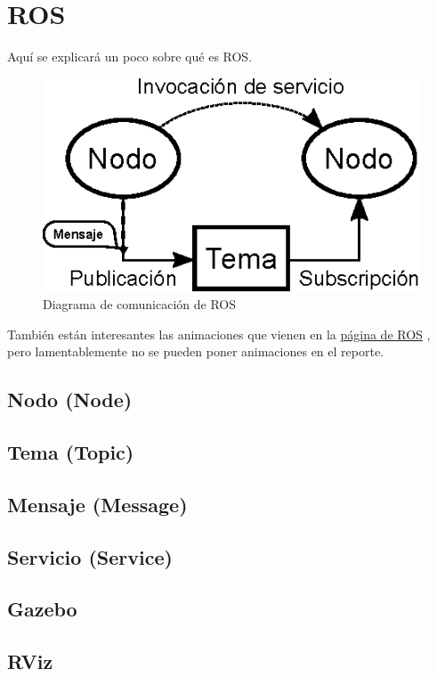 \section{ROS} \label{sec:ros}
Aquí se explicará un poco sobre qué es ROS.
\begin{figure}[h]
	\centering
	\includegraphics[width=0.5\linewidth]{img/ROS_concepts}
	\caption{Diagrama de comunicación de ROS}
	\label{fig:rosconcepts}
\end{figure}

También están interesantes las animaciones que vienen en la \href{https://docs.ros.org/en/humble/Tutorials/Beginner-CLI-Tools/Understanding-ROS2-Topics/Understanding-ROS2-Topics.html}{página de ROS} \cite{ros2-understanding-topics}, pero lamentablemente no se pueden poner animaciones en el reporte.

\subsection{Nodo (Node)}
\subsection{Tema (Topic)}
\subsection{Mensaje (Message)}
\subsection{Servicio (Service)}
\subsection{Gazebo}
\subsection{RViz}
